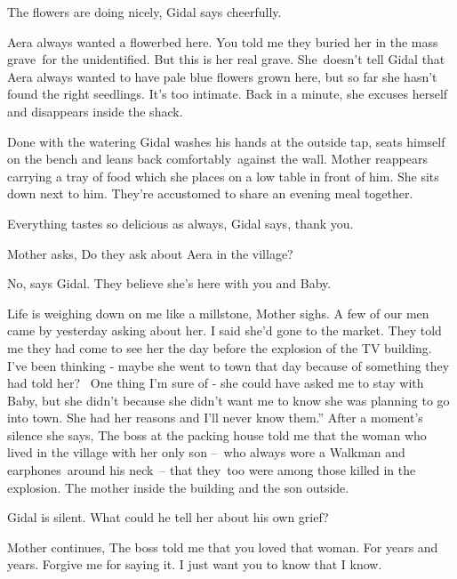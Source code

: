 \documentclass[twoside,11pt]{book}
\begin{document}
{\textquotedbl}The flowers are doing nicely,{\textquotedbl} Gidal says cheerfully.

{\textquotedbl}Aera always wanted a flowerbed here. You told me they buried her in the mass grave~for the unidentified.
But this is her real grave.{\textquotedbl} She~doesn't tell Gidal that Aera always wanted to have pale blue flowers
grown here, but so far she hasn't found the right seedlings. It's too intimate. {\textquotedbl}Back in a
minute,{\textquotedbl} she excuses herself and disappears inside the shack.

Done with the watering Gidal washes his hands at the outside tap, seats himself on the bench and leans back
comfortably~against the wall. Mother reappears carrying a tray of food which she places on a low table in front of him.
She sits down next to him. They're accustomed to share an evening meal together.\ 

{\textquotedbl}Everything tastes so delicious as always,{\textquotedbl} Gidal says, {\textquotedbl}thank
you.{\textquotedbl} 

Mother asks, {\textquotedbl}Do they ask about Aera in the village?{\textquotedbl} 

{\textquotedbl}No,{\textquotedbl} says Gidal. {\textquotedbl}They believe she's here with you and Baby.{\textquotedbl}

{\textquotedbl}Life is weighing down on me like a millstone,{\textquotedbl} Mother sighs. {\textquotedbl}A few of our
men came by yesterday asking about her. I said she'd gone to the market. They told me they had come to see her the day
before the explosion of the TV building. I've been thinking - maybe she went to town that day because of something they
had told her? ~One thing I'm sure of - she could have asked me to stay with Baby, but she didn't because she didn't
want me to know she was planning to go into town. She had her reasons and I'll never know them.'' After a moment's
silence she says, {\textquotedbl}The boss at the packing house told me that the woman who lived in the village with her
only son --\ who always wore a Walkman and earphones\ around his neck\ {}-- that they~too were among those killed in
the explosion. The mother inside the building and the son outside.{\textquotedbl} 

Gidal is silent. What could he tell her about his own grief? ~

Mother continues, {\textquotedbl}The boss told me that you loved that woman. For years and years. Forgive me for saying
it. I just want you to know that I know.{\textquotedbl} 
\end{document}
